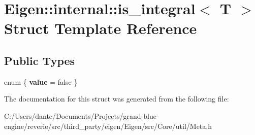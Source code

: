 \hypertarget{struct_eigen_1_1internal_1_1is__integral}{}\section{Eigen\+::internal\+::is\+\_\+integral$<$ T $>$ Struct Template Reference}
\label{struct_eigen_1_1internal_1_1is__integral}
\subsection*{Public Types}
\begin{DoxyCompactItemize}
\item 
\mbox{\label{struct_eigen_1_1internal_1_1is__integral_ad0331e294dd351964479bd28c0354189}} 
enum \{ {\bfseries value} = false
 \}
\end{DoxyCompactItemize}


The documentation for this struct was generated from the following file\+:\begin{DoxyCompactItemize}
\item 
C\+:/\+Users/dante/\+Documents/\+Projects/grand-\/blue-\/engine/reverie/src/third\+\_\+party/eigen/\+Eigen/src/\+Core/util/Meta.\+h\end{DoxyCompactItemize}
